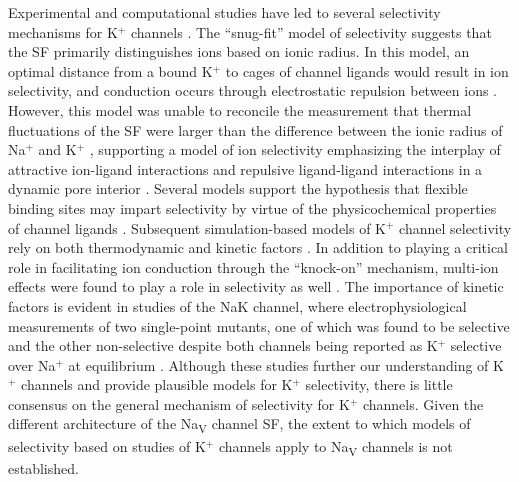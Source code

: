 \begin{refsection}
Experimental and computational studies have led to several selectivity mechanisms for K$^+$ channels \cite{Andersen:2011ty,Roux:2017bs}. The ``snug-fit'' model of selectivity suggests that the SF primarily distinguishes ions based on ionic radius. In this model, an optimal distance from a bound K$^+$ to cages of channel ligands would result in ion selectivity, and conduction occurs through electrostatic repulsion between ions \cite{Mullins:1960tn,Bezanilla:1972uz}.  However, this model was unable to reconcile the measurement that thermal fluctuations of the SF were larger than the difference between the ionic radius of Na$^+$ and K$^+$ \cite{Noskov:2004tv}, supporting a model of ion selectivity emphasizing the interplay of attractive ion-ligand interactions and repulsive ligand-ligand interactions in a dynamic pore interior \cite{Noskov:2006fd}. Several models support the hypothesis that flexible binding sites may impart selectivity by virtue of the physicochemical properties of channel ligands \cite{Yu:2010dj,Varma:2007ws,Dixit:2009fo}. Subsequent simulation-based models of K$^+$ channel selectivity rely on both thermodynamic and kinetic factors \cite{Kim:2011eg,Thompson:2009ig}. In addition to playing a critical role in facilitating ion conduction through the ``knock-on'' mechanism, multi-ion effects were found to play a role in selectivity as well \cite{Ye:2010hs,Derebe:2011jc,Sauer:2011ky}. The importance of kinetic factors is evident in studies of the NaK channel, where electrophysiological measurements of two single-point mutants, one of which was found to be selective and the other non-selective despite both channels being reported as K$^+$ selective over Na$^+$ at equilibrium \cite{Liu:2013hf,Sauer:2013gk}. Although these studies further our understanding of K$^+$ channels and provide plausible models for K$^+$ selectivity, there is little consensus on the general mechanism of selectivity for K$^+$ channels. Given the different architecture of the Na\textsubscript{V} channel SF, the extent to which models of selectivity based on studies of K$^+$ channels apply to Na\textsubscript{V} channels is not established.



\end{refsection}

